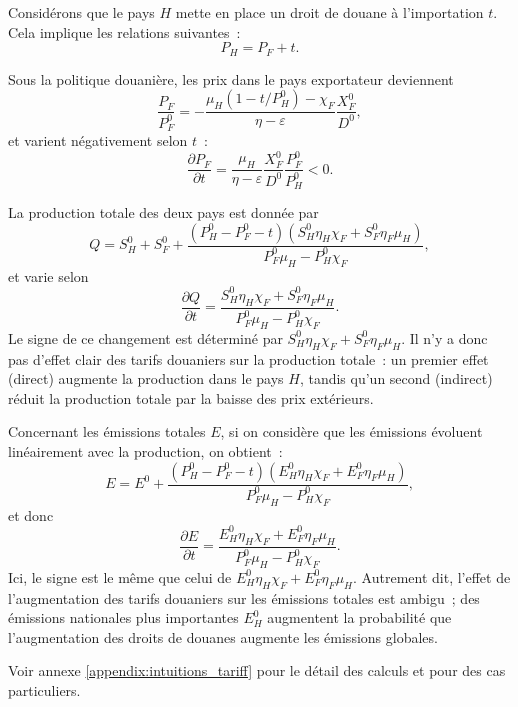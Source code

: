 Considérons que le pays $H$ mette en place un droit de douane à l'importation $t$. Cela implique les relations suivantes~:
$$
    P_H = P_F + t.
$$

Sous la politique douanière, les prix dans le pays exportateur deviennent
$$
    \frac{P_F}{P_F^0} = -\frac{\mu_H (1 - t/P_H^0) - \chi_F}{\eta - \varepsilon}\frac{X_F^0}{D^0},
$$
et varient négativement selon $t$~:
$$
    \frac{\partial P_F}{\partial t} = \frac{\mu_H}{\eta - \varepsilon} \frac{X_F^0}{D^0} \frac{P_F^0}{P_H^0} < 0.
$$

La production totale des deux pays est donnée par
$$
    Q = S_H^0 + S_F^0 + \frac{(P_H^0 - P_F^0 - t)(S_H^0 \eta_H \chi_F + S_F^0 \eta_F \mu_H)}{P_F^0 \mu_H - P_H^0 \chi_F},
$$
et varie selon
$$
    \frac{\partial Q}{\partial t} = \frac{S_H^0 \eta_H \chi_F + S_F^0 \eta_F \mu_H}{P_F^0 \mu_H - P_H^0 \chi_F}.
$$
Le signe de ce changement est déterminé par $S_H^0 \eta_H \chi_F + S_F^0 \eta_F \mu_H$. Il n'y a donc pas d'effet clair des tarifs douaniers sur la production totale~: un premier effet (direct) augmente la production dans le pays $H$, tandis qu'un second (indirect) réduit la production totale par la baisse des prix extérieurs.

Concernant les émissions totales $E$, si on considère que les émissions évoluent linéairement avec la production, on obtient~:
$$
    E = E^0 + \frac{(P_H^0 - P_F^0 - t)(E_H^0 \eta_H \chi_F + E_F^0 \eta_F \mu_H)}{P_F^0 \mu_H - P_H^0 \chi_F},
$$
et donc
$$
    \frac{\partial E}{\partial t} = \frac{E_H^0 \eta_H \chi_F + E_F^0 \eta_F \mu_H}{P_F^0 \mu_H - P_H^0 \chi_F}.
$$
Ici, le signe est le même que celui de $E_H^0 \eta_H \chi_F + E_F^0 \eta_F \mu_H$. Autrement dit, l'effet de l'augmentation des tarifs douaniers sur les émissions totales est ambigu~; des émissions nationales plus importantes $E_H^0$ augmentent la probabilité que l'augmentation des droits de douanes augmente les émissions globales.

Voir annexe \ref{appendix:intuitions_tariff} pour le détail des calculs et pour des cas particuliers.
